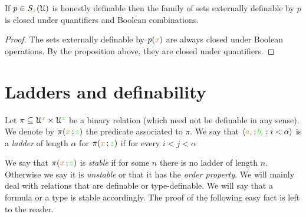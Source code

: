 \begin{corollary}
If $p\in S_{{\color{brown} x}}(\EuScript U)$ is honestly definable then the family of sets externally definable by $p$ is closed under quantifiers and Boolean combinations.
\end{corollary}

\begin{proof}
The sets externally definable by $p({\color{brown} x})$ are always closed under Boolean operations.
By the proposition above, they are closed under quantifiers.
\end{proof}


\section{Ladders and definability}


Let $\pi\subseteq\EuScript U^{\color{brown} x}\times\EuScript U^{\color{green} z}$ be a binary relation (which need not be definable in any sense).
We denote by $\pi({\color{brown} x}\,;{\color{green} z})$ the predicate associated to $\pi$.
We say that $\langle{\color{brown}a_i}\,;{\color{green} b_i} : i<\alpha\rangle$ is a \emph{ladder\/} of length $\alpha$ for $\pi({\color{brown} x}\,;{\color{green} z})$ if for every $i<j<\alpha$


We say that $\pi({\color{brown} x}\,;{\color{green} z})$ is \emph{stable\/} if for some $n$ there is no ladder of length $n$.
Otherwise we say it is \emph{unstable} or that it has the \emph{order property}.
We will mainly deal with relations that are definable or type-definable.
We will say that a formula or a type is stable accordingly.
The proof of the following easy fact is left to the reader.

